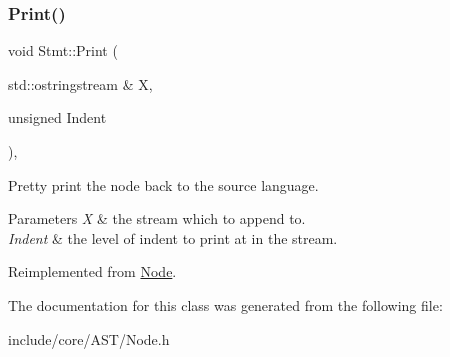 \subsubsection{\texorpdfstring{Print()}{Print()}}
{\footnotesize\ttfamily void Stmt\+::\+Print (\begin{DoxyParamCaption}\item[{std\+::ostringstream \&}]{X,  }\item[{unsigned}]{Indent }\end{DoxyParamCaption})\hspace{0.3cm}{\ttfamily [override]}, {\ttfamily [virtual]}}

Pretty print the node back to the source language. 
\begin{DoxyParams}{Parameters}
{\em X} & the stream which to append to. \\
\hline
{\em Indent} & the level of indent to print at in the stream. \\
\hline
\end{DoxyParams}


Reimplemented from \mbox{\hyperlink{class_node_a5325b760a6e6fe94227c0cff53af2c45}{Node}}.



The documentation for this class was generated from the following file\+:\begin{DoxyCompactItemize}
\item 
include/core/\+A\+S\+T/Node.\+h\end{DoxyCompactItemize}
